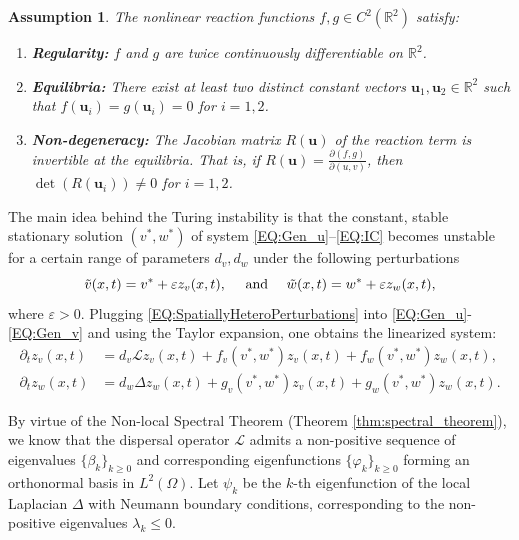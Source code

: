 \documentclass[11pt, a4paper]{article}
\theoremstyle{break}
\theoremstyle{break}
\theoremstyle{break}
\newtheorem{asm}{Assumption}[section]
\theoremstyle{break}
\theoremstyle{break}
\theoremstyle{break}
\theoremstyle{break}
\theoremstyle{break}
\theoremstyle{break}
\theoremstyle{break}
\begin{document}
\begin{asm} \label{asm:ReactionKinetics}
    The nonlinear reaction functions $f, g \in C^2(\mathbb{R}^2)$ satisfy:
    \begin{enumerate}[label=(\textit{F\arabic*})]
        \item \textbf{Regularity:} $f$ and $g$ are twice continuously differentiable on $\mathbb{R}^2$.
        \item \textbf{Equilibria:} There exist at least two distinct constant vectors $\mathbf{u}_1, \mathbf{u}_2 \in \mathbb{R}^2$ such that $f(\mathbf{u}_i) = g(\mathbf{u}_i) = 0$ for $i=1,2$.
        \item \textbf{Non-degeneracy:} The Jacobian matrix $R(\mathbf{u})$ of the reaction term is invertible at the equilibria. That is, if $R(\mathbf{u}) = \frac{\partial(f,g)}{\partial(u,v)}$, then $\det(R(\mathbf{u}_i)) \neq 0$ for $i=1,2$.
    \end{enumerate}
\end{asm}

The main idea behind the Turing instability is that the constant, stable stationary solution $(v^*, w^*)$ of system \eqref{EQ:Gen_u}--\eqref{EQ:IC} becomes unstable for a certain range of parameters $d_v, d_w$ under the following perturbations
\begin{equation}
    \label{EQ:SpatiallyHeteroPerturbations}
    \Tilde{v}(x,t) = v^* + \varepsilon z_v(x, t), \quad \text{ and } \quad \Tilde{w}(x,t) = w^* + \varepsilon z_w(x, t),
\end{equation}
where $\varepsilon > 0$. Plugging \eqref{EQ:SpatiallyHeteroPerturbations} into \eqref{EQ:Gen_u}-\eqref{EQ:Gen_v} and using the Taylor expansion, one obtains the linearized system:
\begin{align}
    \partial_t z_v(x, t) &= d_v \mathcal{L} z_v(x, t) + f_v(v^*, w^*) z_v(x, t) + f_w(v^*, w^*) z_w(x,t), \label{EQ:LinearizedKlausmeier_V}\\
    \partial_t z_w(x, t) &= d_w \Delta z_w(x, t) + g_v(v^*, w^*) z_v(x, t) + g_w(v^*, w^*) z_w(x,t). \label{EQ:LinearizedKlausmeier_W}
\end{align}

By virtue of the Non-local Spectral Theorem (Theorem \ref{thm:spectral_theorem}), we know that the dispersal operator $\mathcal{L}$ admits a non-positive sequence of eigenvalues $\{\beta_k\}_{k \geq 0}$ and corresponding eigenfunctions $\{\varphi_k\}_{k \geq 0}$ forming an orthonormal basis in $L^2(\Omega)$. Let $\psi_k$ be the $k$-th eigenfunction of the local Laplacian $\Delta$ with Neumann boundary conditions, corresponding to the non-positive eigenvalues $\lambda_k \le 0$. 
\end{document}
